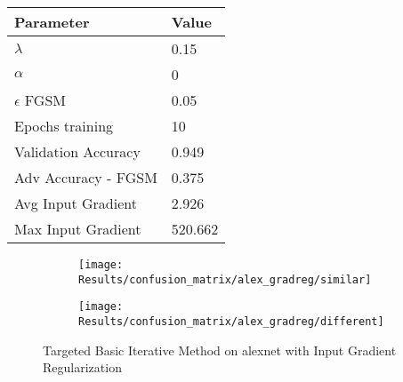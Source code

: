 \documentclass[draft,final]{vutinfth} %
\begin{document}
\begin{table}[h]
  \centering
  \begin{tabular}{ll}
    \toprule
			Parameter			& Value   \\
    \midrule
			$\lambda$								& 0.15		\\
			$\alpha$								& 0				\\
			$\epsilon$ FGSM					& 0.05		\\
			Epochs training					& 10			\\
			
			Validation Accuracy			& 0.949		\\
			Adv Accuracy - FGSM			& 0.375		\\
			
			Avg Input Gradient			& 2.926		\\
			Max Input Gradient			& 520.662 \\
    \bottomrule
  \end{tabular}
\end{table}


\begin{figure}[h]
  \begin{subfigure}[b]{0.5\columnwidth}
		\centering
    \texttt{[image: Results/confusion\_matrix/alex\_gradreg/similar]}%
    \label{fig:exp:cm:alex_gradreg:similar}
  \end{subfigure}
  \begin{subfigure}[b]{0.5\columnwidth}
		\centering
    \texttt{[image: Results/confusion\_matrix/alex\_gradreg/different]}
    \label{fig:exp:cm:alex_gradreg:different}
  \end{subfigure}
  \caption{Targeted Basic Iterative Method on alexnet with Input Gradient Regularization}
	\label{fig:exp:cm:alex_gradreg}
\end{figure}
\clearpage
\end{document}

